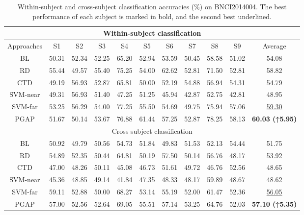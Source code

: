 \documentclass[journal,twocolumn]{IEEEtran}
\begin{document}
\begin{table}[htpb] \centering
  \caption{Within-subject and cross-subject classification accuracies (\%) on BNCI2014004. The best performance of each subject is marked in bold, and the second best underlined.}
  \label{tab:2014004-result}
  \begin{tabular}{c|c|c|c|c|c|c|c|c|c|c}
  \toprule
  \multicolumn{11}{c}{Within-subject classification} \\
  \midrule
  Approaches & S1 & S2 & S3 & S4 & S5 & S6 & S7 & S8 & S9 & Average \\
  \midrule
  BL & 50.31 & 52.34 & 52.25 & 65.20 & 52.94 & 53.59 & 50.45 & 58.58 & 51.02 & 54.08 \\
  RD & 55.44 & 49.57 & 55.40 & 75.25 & 54.00 & 62.62 & 52.81 & 71.50 & 52.81 & 58.82 \\
  CTD & 49.19 & 56.93 & 52.87 & 65.81 & 50.00 & 52.19 & 54.88 & 56.94 & 54.31 & 54.79 \\
  SVM-near & 49.31 & 56.93 & 51.40 & 47.25 & 51.25 & 45.94 & 42.87 & 52.75 & 42.81 & 48.95 \\
  SVM-far & 53.25 & 56.29 & 54.00 & 77.25 & 55.50 & 54.69 & 49.75 & 75.94 & 57.06 & \underline{59.30} \\
  PGAP & 51.67 & 50.14 & 53.67 & 76.88 & 61.44 & 57.25 & 52.87 & 78.25 & 58.13 & \textbf{60.03 (↑5.95)} \\
  \midrule
  \multicolumn{11}{c}{Cross-subject classification} \\
  \midrule
  BL & 50.92 & 49.79 & 50.56 & 54.73 & 51.84 & 49.83 & 51.53 & 52.13 & 54.44 & 51.75 \\
  RD & 54.89 & 52.35 & 50.44 & 64.81 & 50.19 & 57.50 & 50.14 & 56.76 & 48.17 & 53.92 \\
  CTD & 47.00 & 48.26 & 50.11 & 45.08 & 46.73 & 51.61 & 49.72 & 46.76 & 52.56 & 48.65 \\
  SVM-near & 45.36 & 48.85 & 49.14 & 41.84 & 47.35 & 48.33 & 48.17 & 59.89 & 48.67 & 48.62 \\
  SVM-far & 59.11 & 52.88 & 50.00 & 68.27 & 53.14 & 55.19 & 52.00 & 61.47 & 52.36 & \underline{56.05} \\
  PGAP & 57.00 & 52.56 & 52.64 & 69.05 & 55.51 & 57.14 & 53.25 & 64.76 & 52.03 & \textbf{57.10 (↑5.35)} \\
  \bottomrule
  \end{tabular}
\end{table}
\end{document}
